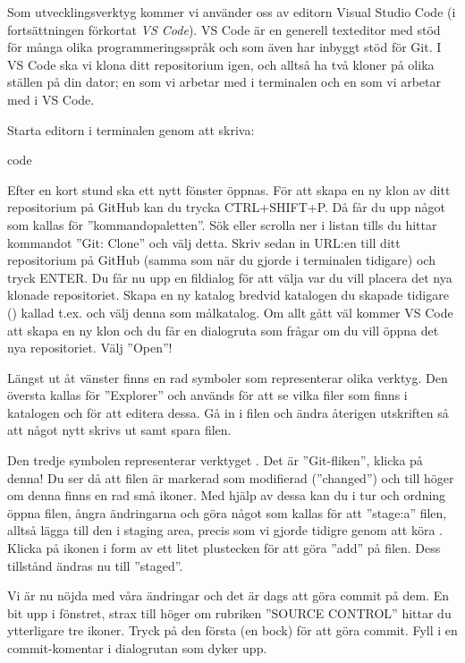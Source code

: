 \begin{Datorarbete}
	Som utvecklingsverktyg kommer vi använder oss av editorn Visual Studio Code (i fortsättningen förkortat \emph{VS Code}). VS Code är en generell texteditor med stöd för många olika programmeringsspråk och som även har inbyggt stöd för Git. I VS Code ska vi klona ditt repositorium igen, och alltså ha två kloner på olika ställen på din dator; en som vi arbetar med i terminalen och en som vi arbetar med i VS Code.

	Starta editorn i terminalen genom att skriva:

	\begin{Code}
		code
	\end{Code}

	Efter en kort stund ska ett nytt fönster öppnas. För att skapa en ny klon av ditt repositorium på GitHub kan du trycka CTRL+SHIFT+P. Då får du upp något som kallas för ''kommandopaletten''. Sök eller scrolla ner i listan tills du hittar kommandot ''Git: Clone'' och välj detta. Skriv sedan in URL:en till ditt repositorium på GitHub (samma som när du gjorde  i terminalen tidigare) och tryck ENTER. Du får nu upp en fildialog för att välja var du vill placera det nya klonade repositoriet. Skapa en ny katalog bredvid katalogen du skapade tidigare () kallad t.ex.  och välj denna som målkatalog. Om allt gått väl kommer VS Code att skapa en ny klon och du får en dialogruta som frågar om du vill öppna det nya repositoriet. Välj ''Open''!

	\item Längst ut åt vänster finns en rad symboler som representerar olika verktyg. Den översta kallas för ''Explorer'' och används för att se vilka filer som finns i katalogen och för att editera dessa. Gå in i filen  och ändra återigen utskriften så att något nytt skrivs ut samt spara filen.

	Den tredje symbolen representerar verktyget . Det är ''Git-fliken'', klicka på denna! Du ser då att filen   är markerad som modifierad (''changed'') och till höger om denna finns en rad små ikoner. Med hjälp av dessa kan du i tur och ordning öppna filen, ångra ändringarna och göra något som kallas för att ''stage:a'' filen, alltså lägga till den i staging area, precis som vi gjorde tidigre genom att köra . Klicka på ikonen i form av ett litet plustecken för att göra ''add'' på filen. Dess tillstånd ändras nu till ''staged''.

	Vi är nu  nöjda med våra ändringar och det är dags att göra commit på dem. En bit upp i fönstret, strax till höger om rubriken ''SOURCE CONTROL'' hittar du ytterligare tre ikoner. Tryck på den första (en bock) för att göra commit. Fyll i en commit-komentar i dialogrutan som dyker upp.


\end{Datorarbete}
